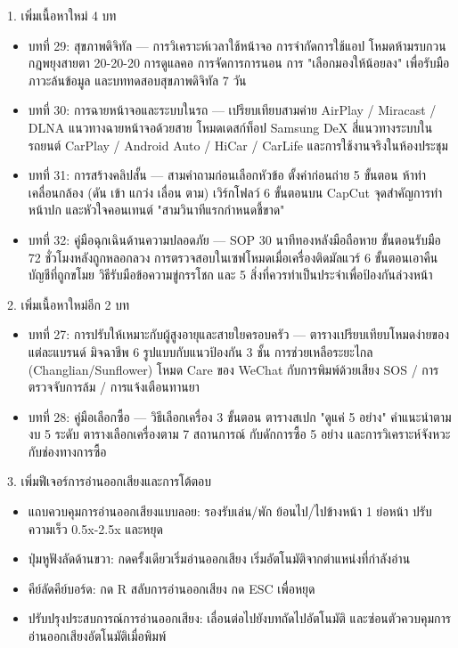 
1. เพิ่มเนื้อหาใหม่ 4 บท

\begin{itemize}
  \item บทที่ 29: สุขภาพดิจิทัล — การวิเคราะห์เวลาใช้หน้าจอ การจำกัดการใช้แอป โหมดห้ามรบกวน กฎพยุงสายตา 20-20-20 การดูแลคอ การจัดการการนอน การ "เลือกมองให้น้อยลง" เพื่อรับมือภาวะล้นข้อมูล และบททดสอบสุขภาพดิจิทัล 7 วัน
  \item บทที่ 30: การฉายหน้าจอและระบบในรถ — เปรียบเทียบสามค่าย AirPlay / Miracast / DLNA แนวทางฉายหน้าจอด้วยสาย โหมดเดสก์ท็อป Samsung DeX สี่แนวทางระบบในรถยนต์ CarPlay / Android Auto / HiCar / CarLife และการใช้งานจริงในห้องประชุม
  \item บทที่ 31: การสร้างคลิปสั้น — สามคำถามก่อนเลือกหัวข้อ ตั้งค่าก่อนถ่าย 5 ขั้นตอน ห้าท่าเคลื่อนกล้อง (ดัน เข้า แกว่ง เลื่อน ตาม) เวิร์กโฟลว์ 6 ขั้นตอนบน CapCut จุดสำคัญการทำหน้าปก และหัวใจคอนเทนต์ "สามวินาทีแรกกำหนดชี้ขาด"
  \item บทที่ 32: คู่มือฉุกเฉินด้านความปลอดภัย — SOP 30 นาทีทองหลังมือถือหาย ขั้นตอนรับมือ 72 ชั่วโมงหลังถูกหลอกลวง การตรวจสอบในเซฟโหมดเมื่อเครื่องติดมัลแวร์ 6 ขั้นตอนเอาคืนบัญชีที่ถูกขโมย วิธีรับมือข้อความขู่กรรโชก และ 5 สิ่งที่ควรทำเป็นประจำเพื่อป้องกันล่วงหน้า
\end{itemize}

2. เพิ่มเนื้อหาใหม่อีก 2 บท

\begin{itemize}
  \item บทที่ 27: การปรับให้เหมาะกับผู้สูงอายุและสายใยครอบครัว — ตารางเปรียบเทียบโหมดง่ายของแต่ละแบรนด์ มิจฉาชีพ 6 รูปแบบกับแนวป้องกัน 3 ชั้น การช่วยเหลือระยะไกล (Changlian/Sunflower) โหมด Care ของ WeChat กับการพิมพ์ด้วยเสียง SOS / การตรวจจับการล้ม / การแจ้งเตือนทานยา
  \item บทที่ 28: คู่มือเลือกซื้อ — วิธีเลือกเครื่อง 3 ขั้นตอน ตารางสเปก "ดูแค่ 5 อย่าง" คำแนะนำตามงบ 5 ระดับ ตารางเลือกเครื่องตาม 7 สถานการณ์ กับดักการซื้อ 5 อย่าง และการวิเคราะห์จังหวะกับช่องทางการซื้อ
\end{itemize}

3. เพิ่มฟีเจอร์การอ่านออกเสียงและการโต้ตอบ

\begin{itemize}
  \item แถบควบคุมการอ่านออกเสียงแบบลอย: รองรับเล่น/พัก ย้อนไป/ไปข้างหน้า 1 ย่อหน้า ปรับความเร็ว 0.5x-2.5x และหยุด
  \item ปุ่มหูฟังลัดด้านขวา: กดครั้งเดียวเริ่มอ่านออกเสียง เริ่มอัตโนมัติจากตำแหน่งที่กำลังอ่าน
  \item คีย์ลัดคีย์บอร์ด: กด R สลับการอ่านออกเสียง กด ESC เพื่อหยุด
  \item ปรับปรุงประสบการณ์การอ่านออกเสียง: เลื่อนต่อไปยังบทถัดไปอัตโนมัติ และซ่อนตัวควบคุมการอ่านออกเสียงอัตโนมัติเมื่อพิมพ์
\end{itemize}

